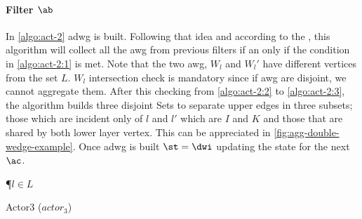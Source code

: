 \paragraph{Filter $\ab$} In \autoref{algo:act-2} \acrshort{adwg} is built. Following that idea and according to the , this algorithm will collect all the \acrshort{awg} 
from previous filters if an only if the condition in \autoref{algo:act-2:1} is met. Note that the two \acrshort{awg}, $W_l$ and $W_l'$ have different vertices from the set $L$. $W_l$ intersection check is mandatory since if \acrshort{awg} are disjoint, we cannot aggregate them.
After this checking from \autoref{algo:act-2:2} to \autoref{algo:act-2:3}, the algorithm builds three disjoint Sets to separate upper edges in three subsets; those which are incident only of 
$l$ and $l'$ which are $I$ and $K$ and those that are shared by both lower layer vertex. This can be appreciated in \autoref{fig:agg-double-wedge-example}.
Once \acrshort{adwg} is built $\st = \dwi$ updating the state for the next $\ac$.


\begin{algorithm}
\DontPrintSemicolon
{}
\SetAlgoRefName{[A7]}
\P{$l \in L$}
\FS{$\dwi \subseteq \dw$}
\BlankLine
{}
\PC{$|\ati| \geq 1 \lor \fid$}
\caption{Actor3 ($actor_3$)}
\label{algo:act-3}
\end{algorithm}

